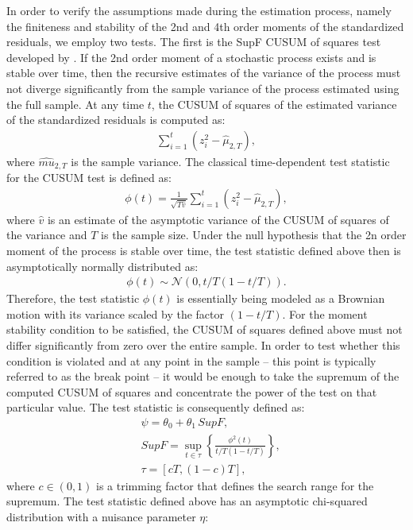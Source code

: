 \documentclass{article} %
\begin{document}
	In order to verify the assumptions made during the estimation process, namely the finiteness and stability of the 2nd and 4th order moments of the standardized residuals, we employ two tests. The first is the SupF CUSUM of squares test developed by \textcite{HANSEN_CUSUM} \textcite{ANDREWS_CUSUM}. If the 2nd order moment of a stochastic process exists and is stable over time, then the recursive estimates of the variance of the process must not diverge significantly from the sample variance of the process estimated using the full sample. At any time $t$, the CUSUM of squares of the estimated variance of the standardized residuals is computed as:
	\begin{align}
		\sum_{i=1}^t (z_i^2 - \hat{\mu}_{2,T}),
	\end{align}
	where $\hat{mu}_{2,T}$ is the sample variance. The classical time-dependent test statistic for the CUSUM test is defined as:
	\begin{align}
		\phi(t) = \frac{1}{\sqrt{T\hat{v}}} \sum_{i=1}^t (z_i^2 - \hat{\mu}_{2,T}),
	\end{align}
	where $\hat{v}$ is an estimate of the asymptotic variance of the CUSUM of squares of the variance and $T$ is the sample size. Under the null hypothesis that the 2n order moment of the process is stable over time, the test statistic defined above then is asymptotically normally distributed as:
	\begin{align}
		\phi(t) \sim \mathcal{N}(0,t/T(1-t/T)).
	\end{align}
	Therefore, the test statistic $\phi(t)$ is essentially being modeled as a Brownian motion with its variance scaled by the factor $(1-t/T)$. For the moment stability condition to be satisfied, the CUSUM of squares defined above must not differ significantly from zero over the entire sample. In order to test whether this condition is violated and at any point in the sample -- this point is typically referred to as the break point -- it would be enough to take the supremum of the computed CUSUM of squares and concentrate the power of the test on that particular value. The test statistic is consequently defined as:
	\begin{align}
		&\psi = \theta_0 + \theta_1 \, SupF, \\
		&SupF = \sup_{t \in \tau} \left\{ \frac{\phi^2(t)}{t/T (1-t/T)} \right\}, \\
		&\tau = [cT, (1-c)T],
	\end{align}
	where $c\in(0,1)$ is a trimming factor that defines the search range for the supremum. The test statistic defined above has an asymptotic chi-squared distribution with a nuisance parameter $\eta$:
\end{document}
